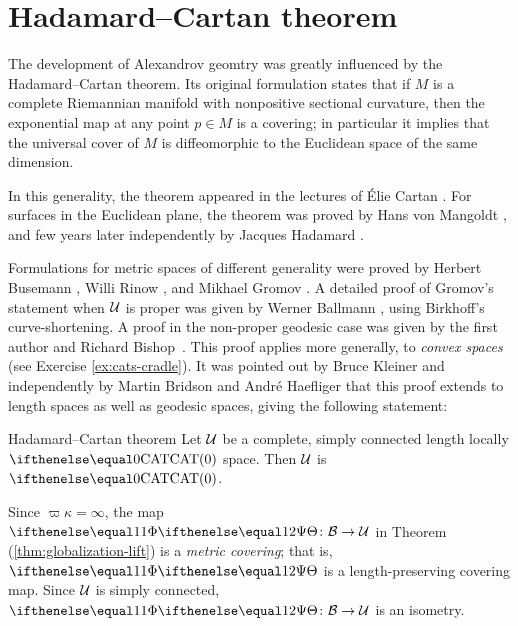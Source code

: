 
\section{Hadamard--Cartan theorem}\label{sec:Hadamard--Cartan}

The development of Alexandrov geomtry was greatly influenced by the Hadamard--Cartan theorem.
Its original formulation states that if $M$ is a complete Riemannian manifold with nonpositive sectional curvature, 
then the exponential map at any point $p\in M$ is a covering;
in particular it implies that the universal cover of $M$ is diffeomorphic to the Euclidean space of the same dimension.

In this generality, the theorem appeared in the lectures of \'Elie Cartan \cite{cartan}.
For surfaces in the Euclidean plane, 
the theorem was proved by
Hans von Mangoldt \cite{mangoldt},  
and few years later independently by Jacques Hadamard \cite{hadamard}.

Formulations for metric spaces of different generality were proved by 
Herbert Busemann \cite{busemann-CBA},
Willi Rinow \cite{rinow}, and 
Mikhael Gromov \cite[p.~119]{gromov:hyp-groups}. 
A detailed proof of Gromov's statement when $\mathcal{U}$ is proper  was given by Werner Ballmann \cite{ballmann:cartan-hadamard}, using Birkhoff's curve-shortening.  
A proof in the non-proper 
geodesic case 
was given by the first author and Richard Bishop~\cite{alexander-bishop:h-c}.  
This proof applies more generally, to {}\emph{convex spaces} (see Exercise \ref{ex:cats-cradle}).
It was pointed out by Bruce 
Kleiner \cite{ballmann:lectures} 
and independently by Martin 
Bridson and Andr\'{e} 
Haefliger \cite{bridson-haefliger} that 
this proof
extends to length spaces as well as geodesic spaces, giving the following statement:

\begin{thm}{Hadamard--Cartan theorem}
\label{thm:hadamard-cartan}
Let $\mathcal{U}$ be a complete,  simply connected length locally $\CAT0$ space.
Then $\mathcal{U}$ is $\CAT0$.
\end{thm}

 Since $\varpi\kappa=\infty$,
the map $\map\:\spc{B}\to\spc{U}$ in Theorem
(\ref{thm:globalization-lift}) is a \emph{metric covering};
 that is, $\map$ is a length-preserving covering map. 
Since $\mathcal{U}$ is simply connected, $\map\:\spc{B}\to\spc{U}$ is an isometry.
\qeds

